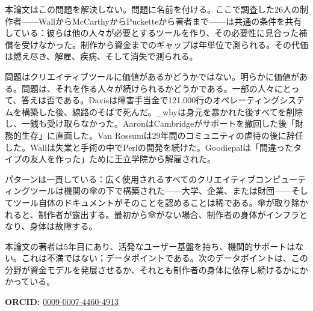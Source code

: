 \documentclass[10pt,letterpaper,twocolumn]{article}
\begin{document}
本論文はこの問題を解決しない。問題に名前を付ける。ここで調査した26人の制作者——WallからMcCarthyからPucketteから著者まで——は共通の条件を共有している：彼らは他の人々が必要とするツールを作り、その必要性に見合った補償を受けなかった。制作から資金までのギャップは年単位で測られる。その代価は燃え尽き、解雇、疾病、そして消失で測られる。

問題はクリエイティブツールに価値があるかどうかではない。明らかに価値がある。問題は、それを作る人々が続けられるかどうかである。一部の人々にとって、答えは否である。Davisは障害手当金で121,000行のオペレーティングシステムを構築した後、線路のそばで死んだ。\_whyは身元を暴かれた後すべてを削除し、一銭も受け取らなかった。AaronはCambridgeがサポートを撤回した後「財務的生存」に直面した。Van Rossumは29年間のコミュニティの虐待の後に辞任した。Wallは失業と手術の中でPerlの開発を続けた。Goodiepalは「間違ったタイプの友人を作った」ために王立学院から解雇された。

パターンは一貫している：広く使用されるすべてのクリエイティブコンピューティングツールは機関の傘の下で構築された——大学、企業、または財団——そしてツール自体のドキュメントがそのことを認めることは稀である。傘が取り除かれると、制作者が露出する。最初から傘がない場合、制作者の身体がインフラとなり、身体は故障する。

本論文の著者は5年目にあり、活発なユーザー基盤を持ち、機関的サポートはない。これは不満ではない；データポイントである。次のデータポイントは、この分野が資金モデルを発展させるか、それとも制作者の身体に依存し続けるかにかかっている。

\vspace{0.5em}
\noindent\textbf{ORCID:} \href{https://orcid.org/0009-0007-4460-4913}{0009-0007-4460-4913}



\end{document}
